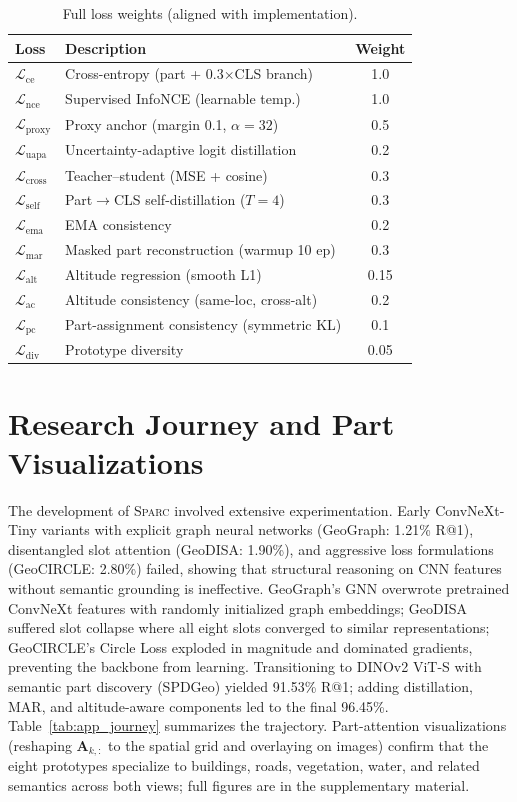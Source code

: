 \documentclass[sigconf, anonymous, review]{acmart}
\newcommand{\ours}{\textsc{Sparc}}
\newcommand{\loss}{\mathcal{L}}
\begin{document}
\begin{table}[h]
\caption{Full loss weights (aligned with implementation).}
\label{tab:app_loss}
\centering
\small
\begin{tabular}{@{}llc@{}}
\toprule
\textbf{Loss} & \textbf{Description} & \textbf{Weight} \\
\midrule
$\loss_\text{ce}$ & Cross-entropy (part + 0.3$\times$CLS branch) & 1.0 \\
$\loss_\text{nce}$ & Supervised InfoNCE (learnable temp.) & 1.0 \\
$\loss_\text{proxy}$ & Proxy anchor (margin 0.1, $\alpha{=}32$) & 0.5 \\
$\loss_\text{uapa}$ & Uncertainty-adaptive logit distillation & 0.2 \\
$\loss_\text{cross}$ & Teacher--student (MSE + cosine) & 0.3 \\
$\loss_\text{self}$ & Part$\to$CLS self-distillation ($T{=}4$) & 0.3 \\
$\loss_\text{ema}$ & EMA consistency & 0.2 \\
$\loss_\text{mar}$ & Masked part reconstruction (warmup 10 ep) & 0.3 \\
$\loss_\text{alt}$ & Altitude regression (smooth L1) & 0.15 \\
$\loss_\text{ac}$ & Altitude consistency (same-loc, cross-alt) & 0.2 \\
$\loss_\text{pc}$ & Part-assignment consistency (symmetric KL) & 0.1 \\
$\loss_\text{div}$ & Prototype diversity & 0.05 \\
\bottomrule
\end{tabular}
\end{table}

\section{Research Journey and Part Visualizations}
\label{sec:appendix_journey}

The development of \ours{} involved extensive experimentation.
Early ConvNeXt-Tiny variants with explicit graph neural networks (GeoGraph: 1.21\% R@1), disentangled slot attention (GeoDISA: 1.90\%), and aggressive loss formulations (GeoCIRCLE: 2.80\%) failed, showing that structural reasoning on CNN features without semantic grounding is ineffective.
GeoGraph's GNN overwrote pretrained ConvNeXt features with randomly initialized graph embeddings; GeoDISA suffered slot collapse where all eight slots converged to similar representations; GeoCIRCLE's Circle Loss exploded in magnitude and dominated gradients, preventing the backbone from learning.
Transitioning to DINOv2 ViT-S with semantic part discovery (SPDGeo) yielded 91.53\% R@1; adding distillation, MAR, and altitude-aware components led to the final 96.45\%.
Table~\ref{tab:app_journey} summarizes the trajectory.
Part-attention visualizations (reshaping $\mathbf{A}_{k,:}$ to the spatial grid and overlaying on images) confirm that the eight prototypes specialize to buildings, roads, vegetation, water, and related semantics across both views; full figures are in the supplementary material.
\end{document}
